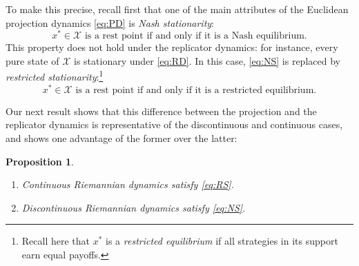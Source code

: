 \documentclass[reqno]{amsart}
\theoremstyle{plain}
\newtheorem{proposition}[theorem]{Proposition}
\theoremstyle{definition}
\theoremstyle{remark}
\numberwithin{equation}{section}
\numberwithin{theorem}{section}
\begin{document}
To make this precise, recall first that one of the main attributes of the Euclidean projection dynamics \eqref{eq:PD} is \emph{Nash stationarity}:
\begin{equation}
\label{eq:NS}
\tag{NS}
\text{${x^{\ast}}\in{\mathcal{X}}$ is a rest point if and only if it is a Nash equilibrium.}
\end{equation}
This property does not hold under the replicator dynamics:
for instance, every pure state of ${\mathcal{X}}$ is stationary under \eqref{eq:RD}.
In this case, \eqref{eq:NS} is replaced by \emph{restricted stationarity}:\footnote{Recall here that $x^\ast$ is a \emph{restricted equilibrium} if all strategies in its support earn equal payoffs.}
\begin{equation}
\label{eq:RS}
\tag{RS}
\text{${x^{\ast}}\in{\mathcal{X}}$ is a rest point if and only if it is a restricted equilibrium.}
\end{equation}

Our next result shows that this difference between the projection and the replicator dynamics is representative of the discontinuous and continuous cases, and shows one advantage of the former over the latter:

\begin{proposition}
\label{prop:stationary}
\leavevmode
\begin{enumerate}
\item
\label{itm:stationary-min}
Continuous Riemannian dynamics satisfy \eqref{eq:RS}. 
\item
\label{itm:stationary-full}
Discontinuous Riemannian dynamics satisfy \eqref{eq:NS}. 
\end{enumerate}
\end{proposition}
\end{document}
